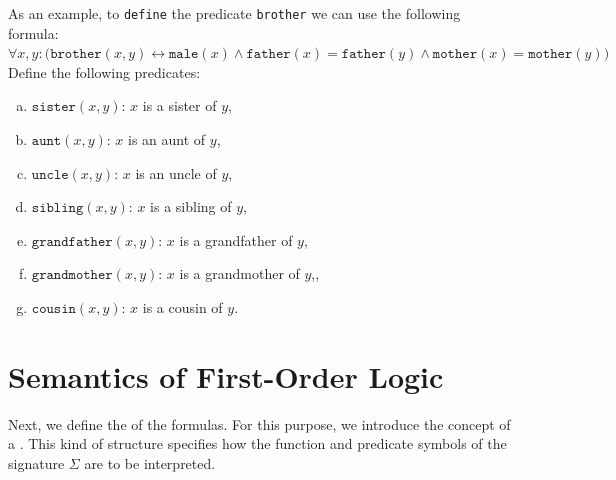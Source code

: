 As an example, to \texttt{define} the predicate \texttt{brother} we can use the following formula:
\\[0.2cm]
\hspace*{1.3cm}
$\forall x, y:\bigl(\mathtt{brother}(x, y) \leftrightarrow \mathtt{male}(x) \wedge \mathtt{father}(x)
= \mathtt{father}(y) \wedge \mathtt{mother}(x) = \mathtt{mother}(y)\bigr)$
\\[0.2cm]
Define the following predicates:
\begin{enumerate}[(a)]
\item $\texttt{sister}(x, y)$: $x$ is a sister of $y$,
\item $\texttt{aunt}(x, y)$: $x$ is an aunt of $y$,
\item $\mathtt{uncle}(x, y)$:  $x$ is an uncle of $y$,
\item $\texttt{sibling}(x, y)$: $x$ is a sibling of $y$, 
\item $\texttt{grandfather}(x, y)$: $x$ is a grandfather of $y$,
\item $\texttt{grandmother}(x, y)$: $x$ is a grandmother of $y$,,
\item $\texttt{cousin}(x, y)$: $x$ is a cousin of $y$.
  \eox
\end{enumerate}


\section{Semantics of First-Order Logic \label{sec:semantik}}
Next, we define the  of the formulas. For this purpose, we introduce the concept of a
.  This kind of structure specifies how the
function and predicate symbols of the signature $\Sigma$ are to be interpreted.

